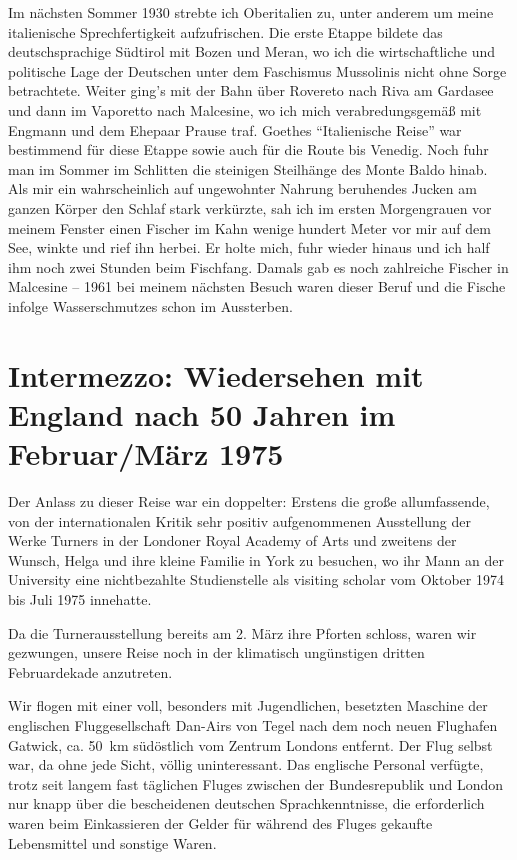 Im nächsten Sommer 1930 strebte ich Oberitalien zu, unter anderem um meine italienische Sprechfertigkeit aufzufrischen. Die erste Etappe bildete das deutschsprachige Südtirol mit Bozen und Meran, wo ich die wirtschaftliche und politische Lage der Deutschen unter dem Faschismus Mussolinis nicht ohne Sorge betrachtete. Weiter ging's mit der Bahn über Rovereto nach Riva am Gardasee und dann im Vaporetto nach Malcesine, wo ich mich verabredungsgemäß mit Engmann und dem Ehepaar Prause traf. Goethes \enquote{Italienische Reise} war bestimmend für diese Etappe sowie auch für die Route bis Venedig. Noch fuhr man im Sommer im Schlitten die steinigen Steilhänge des Monte Baldo hinab. Als mir ein wahrscheinlich auf ungewohnter Nahrung beruhendes Jucken am ganzen Körper den Schlaf stark verkürzte, sah ich im ersten Morgengrauen vor meinem Fenster einen Fischer im Kahn wenige hundert Meter vor mir auf dem See, winkte und rief ihn herbei. Er holte mich, fuhr wieder hinaus und ich half ihm noch zwei Stunden beim Fischfang. Damals gab es noch zahlreiche Fischer in Malcesine -- 1961 bei meinem nächsten Besuch waren dieser Beruf und die Fische infolge Wasserschmutzes schon im Aussterben.


\section{Intermezzo: Wiedersehen mit England nach 50 Jahren im Februar/März 1975}
Der Anlass zu dieser Reise war ein doppelter: Erstens die große allumfassende, von der internationalen Kritik sehr positiv aufgenommenen Ausstellung der Werke Turners in der Londoner Royal Academy of Arts und zweitens der Wunsch, Helga und ihre kleine Familie in York zu besuchen, wo ihr Mann an der University eine nichtbezahlte Studienstelle als visiting scholar vom Oktober 1974 bis Juli 1975 innehatte.

Da die Turnerausstellung bereits am 2. März ihre Pforten schloss, waren wir gezwungen, unsere Reise noch in der klimatisch ungünstigen dritten Februardekade anzutreten.

Wir flogen mit einer voll, besonders mit Jugendlichen, besetzten Maschine der englischen Fluggesellschaft Dan-Airs von Tegel nach dem noch neuen Flughafen Gatwick, ca. 50~km südöstlich vom Zentrum Londons entfernt. Der Flug selbst war, da ohne jede Sicht, völlig uninteressant. Das englische Personal verfügte, trotz seit langem fast täglichen Fluges zwischen der Bundesrepublik und London nur knapp über die bescheidenen deutschen Sprachkenntnisse, die erforderlich waren beim Einkassieren der Gelder für während des Fluges gekaufte Lebensmittel und sonstige Waren.

